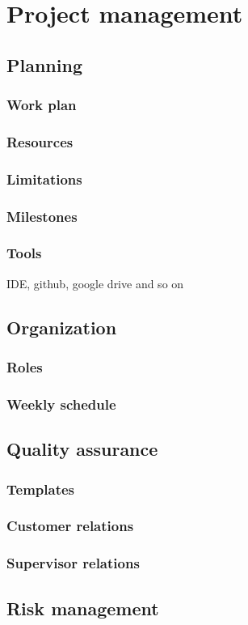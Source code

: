 
\chapter{Project management} %

\label{Project management} %


\section{Planning}
\subsection{Work plan}

\subsection{Resources}
\subsection{Limitations}

\subsection{Milestones}

\subsection{Tools}
IDE, github, google drive and so on

\section{Organization}
\subsection{Roles}
\subsection{Weekly schedule}

\section{Quality assurance}
\subsection{Templates}
\subsection{Customer relations}
\subsection{Supervisor relations}


\section{Risk management}